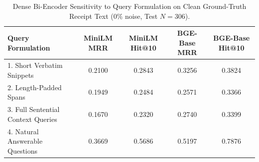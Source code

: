 \begin{table}[t]
\centering\small
\caption{Dense Bi-Encoder Sensitivity to Query Formulation on Clean Ground-Truth Receipt Text ($0\%$ noise, Test $N=306$).}\label{tab:dense_formulation_v6}
\begin{tabular}{lcccc}
\toprule
Query Formulation & MiniLM MRR & MiniLM Hit@10 & BGE-Base MRR & BGE-Base Hit@10 \\
\midrule
1. Short Verbatim Snippets & 0.2100 & 0.2843 & 0.3256 & 0.3824 \\
2. Length-Padded Spans & 0.1949 & 0.2484 & 0.2571 & 0.3366 \\
3. Full Sentential Context Queries & 0.1670 & 0.2320 & 0.2740 & 0.3399 \\
4. Natural Answerable Questions & 0.3669 & 0.5686 & 0.5197 & 0.7876 \\
\bottomrule
\end{tabular}
\end{table}

